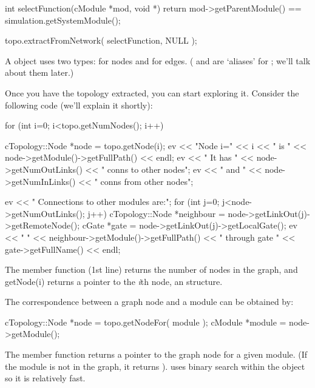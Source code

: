 \begin{cpp}
int selectFunction(cModule *mod, void *)
{
  return mod->getParentModule() == simulation.getSystemModule();
}

topo.extractFromNetwork( selectFunction, NULL );
\end{cpp}

%
%

A  object uses two types:  for
nodes and  for edges. ( and
 are `aliases' for ; we'll
talk about them later.)

Once you have the topology extracted, you can start exploring
it. Consider the following code (we'll explain it shortly):

\begin{cpp}
for (int i=0; i<topo.getNumNodes(); i++)
{
  cTopology::Node *node = topo.getNode(i);
  ev << "Node i=" << i << " is " << node->getModule()->getFullPath() << endl;
  ev << " It has " << node->getNumOutLinks() << " conns to other nodes\n";
  ev << " and " << node->getNumInLinks() << " conns from other nodes\n";

  ev << " Connections to other modules are:\n";
  for (int j=0; j<node->getNumOutLinks(); j++)
  {
    cTopology::Node *neighbour = node->getLinkOut(j)->getRemoteNode();
    cGate *gate = node->getLinkOut(j)->getLocalGate();
    ev << " " << neighbour->getModule()->getFullPath()
       << " through gate " << gate->getFullName() << endl;
  }
}
\end{cpp}

The  member function (1st line) returns the number of
nodes in the graph, and getNode(i) returns a pointer to the \textit{i}th
node, an  structure.


The correspondence between a graph node and a module can be obtained
by:

\begin{cpp}
cTopology::Node *node = topo.getNodeFor( module );
cModule *module = node->getModule();
\end{cpp}


The  member function returns a pointer to the graph
node for a given module. (If the module is not in the graph, it
returns ).  uses binary search within the
 object so it is relatively fast.


